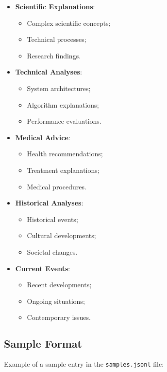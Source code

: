 \begin{itemize}
    \item \textbf{Scientific Explanations}:
    \begin{itemize}
        \item Complex scientific concepts;
        \item Technical processes;
        \item Research findings.
    \end{itemize}
    
    \item \textbf{Technical Analyses}:
    \begin{itemize}
        \item System architectures;
        \item Algorithm explanations;
        \item Performance evaluations.
    \end{itemize}
    
    \item \textbf{Medical Advice}:
    \begin{itemize}
        \item Health recommendations;
        \item Treatment explanations;
        \item Medical procedures.
    \end{itemize}
    
    \item \textbf{Historical Analyses}:
    \begin{itemize}
        \item Historical events;
        \item Cultural developments;
        \item Societal changes.
    \end{itemize}
    
    \item \textbf{Current Events}:
    \begin{itemize}
        \item Recent developments;
        \item Ongoing situations;
        \item Contemporary issues.
    \end{itemize}
\end{itemize}

\subsection{Sample Format}
Example of a sample entry in the \texttt{samples.jsonl} file:


